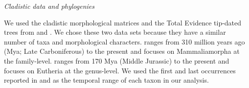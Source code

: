 \documentclass[12pt,letterpaper]{article}
\renewcommand{\subsection}[1]{%
\bigskip
\begin{center}
\begin{large}
\normalfont\itshape #1
\end{large}
\end{center}}
\begin{document}


\subsection{Cladistic data and phylogenies}
We used the cladistic morphological matrices and the Total Evidence tip-dated trees \citep{ronquista2012} from \citet[][103 taxa and 446 morphological characters]{Slater2012MEE} and \citet[][102 taxa and 421 morphological characters]{beckancient2014}.
We chose these two data sets because they have a similar number of taxa and morphological characters.
\cite{Slater2012MEE} ranges from 310 million years ago (Mya; Late Carboniferous) to the present and focuses on Mammaliamorpha at the family-level.
\cite{beckancient2014} ranges from 170 Mya (Middle Jurassic) to the present and focuses on Eutheria at the genus-level.
We used the first and last occurrences reported in \cite{Slater2012MEE} and \cite{beckancient2014} as the temporal range of each taxon in our analysis.
\end{document}
